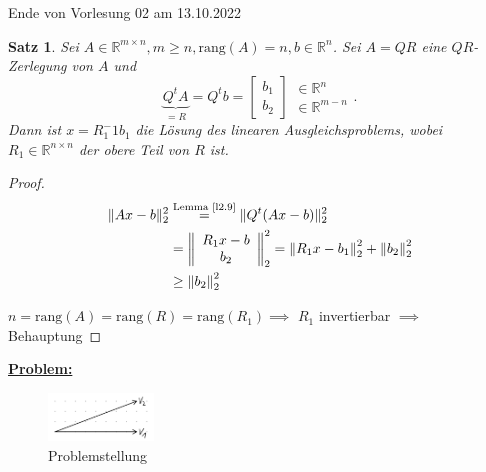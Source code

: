 \documentclass{book}
\newtheorem{theorem}[algorithm]{Satz}
\def\R{\mathbb{R}}
\def\rang{\text{rang}}
\begin{document}
            \noindent
            \xrfill[0.7ex]{1pt}Ende von Vorlesung 02 am 13.10.2022\xrfill[0.7ex]{1pt}
            
            \begin{theorem}\label{s2.11}
                Sei $A\in\R^{m\times n},m\geq n,\rang(A)=n,b\in\R^n$. Sei $A=QR$ eine $QR$-Zerlegung von $A$ und 
                \[\underbrace{Q^tA}_{=R}=Q^tb=\begin{bmatrix}
                    b_1\\
                    b_2
                \end{bmatrix}\begin{array}{c}
                    \in \R^n \\
                    \in\R^{m-n}
                \end{array}.\]
                Dann ist $x=R_1^-1b_1$ die Lösung des linearen Ausgleichsproblems, wobei $R_1\in\R^{n\times n}$ der obere Teil von $R$ ist.
            \end{theorem}

            \begin{proof}
                \begin{align*}
                    \Vert Ax-b \Vert_2^2&\stackrel{\text{Lemma \ref{l2.9}}}{=}\Vert Q^t(Ax-b) \Vert_2^2\\
                    & =\left\Vert \begin{array}{c}
                        R_1 x-b\\ b_2
                    \end{array} \right\Vert_2^2 = \left\Vert R_1x-b_1 \right\Vert_2^2+ \left\Vert b_2 \right\Vert_2^2\\
                    & \geq \left\Vert b_2 \right\Vert_2^2
                \end{align*}

                $n=\rang(A)=\rang(R)=\rang(R_1)\implies$ $R_1$ invertierbar $\implies$ Behauptung

            \end{proof}

            \underline{\textbf{Problem:}}

            \begin{figure}[H]
                \centering
                \includegraphics[width=0.25\textwidth]{Bild004}
                \caption{Problemstellung}
            \end{figure}
\end{document}
